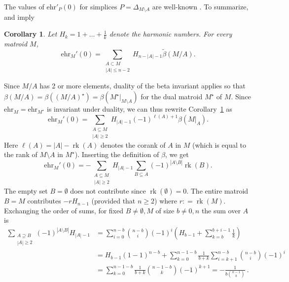 \documentclass[pagesize,paper=A4,11pt,bibliography=totoc,oneside]{scrartcl}
\newtheorem{corollary}[thm]{Corollary}
\newcommand{\defas}{\mathrel{\mathop:}=}
\newcommand{\abs}[1]{\left|#1\right|}
\DeclareMathOperator{\rk}{rk}
\newcommand{\ehr}{\mathrm{ehr}}
\newcommand{\HN}{H} %
\begin{document}
The values of $\ehr'_{P}(0)$ for simplices $P=\Delta_{M\setminus A}$ are well-known \cite[Proposition~4.3]{JochemkoRavichandran:PermuEhrPos}. To summarize, \cite[Corollary~23]{BoroczkyLudwig:MinkowskiLattice} and \cite[Theorem~2.5]{ArdilaBenedettiDoker:MatroidVolumes} imply
\begin{corollary}\label{cor:ehr0-beta}
    Let $H_k=1+\ldots+\frac{1}{k}$ denote the harmonic numbers. For every matroid $M$,
    \begin{equation*}
        \ehr_M'(0)=\sum_{\substack{A\subset M\\ \abs{A}\leq n-2}} \HN_{n-\abs{A}-1} \widetilde{\beta}(M/A).
    \end{equation*}
\end{corollary}
Since $M/A$ has 2 or more elements, duality of the beta invariant applies so that $\beta(M/A)=\beta( (M/A)^\star)=\beta(M^\star|_{M\setminus A})$ for the dual matroid $M^\star$ of $M$. Since $\ehr_M=\ehr_{M^\star}$ is invariant under duality, we can thus rewrite Corollary~\ref{cor:ehr0-beta} as
\begin{equation*}
    \ehr_M'(0)=\sum_{\substack{A\subseteq M\\ \abs{A}\geq 2}} \HN_{\abs{A}-1} (-1)^{\ell(A)+1}\beta(M|_A).
\end{equation*}
Here $\ell(A)=\abs{A}-\rk(A)$ denotes the corank of $A$ in $M$ (which is equal to the rank of $M\setminus A$ in $M^\star$).
Inserting the definition of $\beta$, we get
\begin{equation*}
    \ehr_M'(0)=-\sum_{\substack{A\subseteq M\\ \abs{A}\geq 2}} \HN_{\abs{A}-1} \sum_{B\subseteq A} (-1)^{\abs{A\setminus B}}\rk(B).
\end{equation*}
The empty set $B=\emptyset$ does not contribute since $\rk(\emptyset)=0$. The entire matroid $B=M$ contributes $-r\HN_{n-1}$ (provided that $n\geq 2$) where $r\defas\rk(M)$. Exchanging the order of sums, for fixed $B\neq \emptyset,M$ of size $b\neq 0,n$ the sum over $A$ is
\begin{align*}
    \sum_{\substack{A\supseteq B \\ \abs{A}\geq 2}}  (-1)^{\abs{A\setminus B}} \HN_{\abs{A}-1}
    &= \sum_{i=0}^{n-b} \binom{n-b}{i} (-1)^i \left( \HN_{b-1} + \sum_{k=b}^{b+i-1} \frac{1}{k}\right) \\
    &= \HN_{b-1} (1-1)^{n-b} + \sum_{k=0}^{n-1-b}\frac{1}{b+k} \sum_{i=k+1}^{n-b} \binom{n-b}{i} (-1)^i \\
    &=\sum_{k=0}^{n-1-b}\frac{1}{b+k} \binom{n-1-b}{k} (-1)^{k+1} 
    = - \frac{1}{b\binom{n-1}{b}}\ .
\end{align*}
\end{document}
